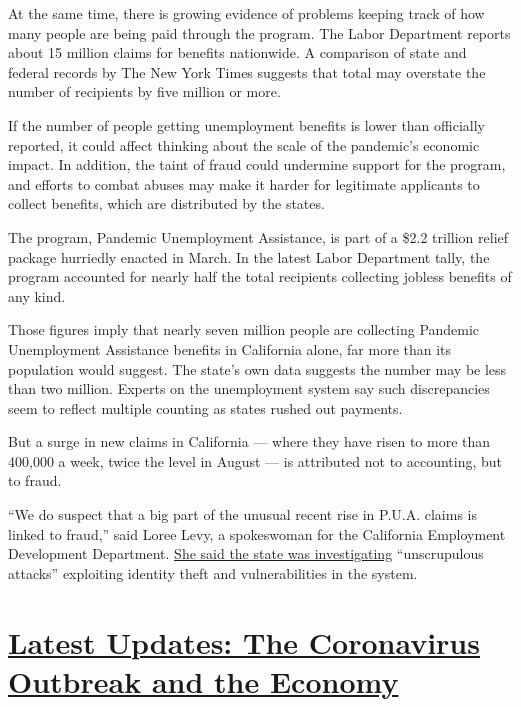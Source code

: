 At the same time, there is growing evidence of problems keeping track of
how many people are being paid through the program. The Labor Department
reports about 15 million claims for benefits nationwide. A comparison of
state and federal records by The New York Times suggests that total may
overstate the number of recipients by five million or more.

If the number of people getting unemployment benefits is lower than
officially reported, it could affect thinking about the scale of the
pandemic's economic impact. In addition, the taint of fraud could
undermine support for the program, and efforts to combat abuses may make
it harder for legitimate applicants to collect benefits, which are
distributed by the states.

The program, Pandemic Unemployment Assistance, is part of a \$2.2
trillion relief package hurriedly enacted in March. In the latest Labor
Department tally, the program accounted for nearly half the total
recipients collecting jobless benefits of any kind.

Those figures imply that nearly seven million people are collecting
Pandemic Unemployment Assistance benefits in California alone, far more
than its population would suggest. The state's own data suggests the
number may be less than two million. Experts on the unemployment system
say such discrepancies seem to reflect multiple counting as states
rushed out payments.

But a surge in new claims in California --- where they have risen to
more than 400,000 a week, twice the level in August --- is attributed
not to accounting, but to fraud.

``We do suspect that a big part of the unusual recent rise in P.U.A.
claims is linked to fraud,'' said Loree Levy, a spokeswoman for the
California Employment Development Department.
\href{https://www.nytimes3xbfgragh.onion/live/2020/09/10/business/stock-market-today-coronavirus/california-is-looking-into-fraud-in-a-pandemic-unemployment-program}{She
said the state was investigating} ``unscrupulous attacks'' exploiting
identity theft and vulnerabilities in the system.

\hypertarget{latest-updates-the-coronavirus-outbreak-and-the-economy}{%
\section{\texorpdfstring{\href{https://www.nytimes3xbfgragh.onion/live/2020/09/11/business/stock-market-today-coronavirus?action=click\&pgtype=Article\&state=default\&region=MAIN_CONTENT_1\&context=storylines_live_updates}{Latest
Updates: The Coronavirus Outbreak and the
Economy}}{Latest Updates: The Coronavirus Outbreak and the Economy}}\label{latest-updates-the-coronavirus-outbreak-and-the-economy}}

